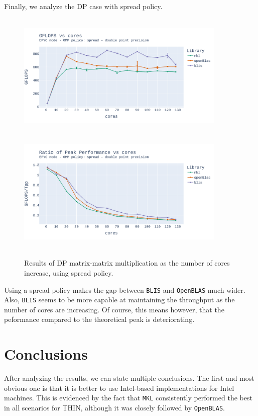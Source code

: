 \documentclass{report}
\begin{document}
Finally, we analyze the DP case with spread policy.

\begin{figure}[H]
\hspace*{-2.5cm}
\includegraphics[width=10cm, height=6cm]{./images/fixed_size_epyc_double_gflops_spread.pdf}
\includegraphics[width=10cm, height=6cm]{./images/fixed_size_epyc_double_gflops_spread_ratio.pdf}
\caption{\label{fig:fixed_size_epyc_double_spread} Results of DP matrix-matrix multiplication 
as the number of cores increase, using spread policy.}
\end{figure}

Using a spread policy makes the gap between \texttt{BLIS} and \texttt{OpenBLAS} much 
wider. Also, \texttt{BLIS} seems to be more capable at maintaining the throughput 
as the number of cores are increasing. Of course, this means however, that the 
peformance compared to the theoretical peak is deteriorating.

\section{Conclusions}

After analyzing the results, we can state multiple conclusions. The first and most 
obvious one is that it is better to use Intel-based implementations for Intel 
machines. This is evidenced by the fact that \texttt{MKL} consistently performed
the best in all scenarios for THIN, although it was closely followed by 
\texttt{OpenBLAS}. 
\end{document}
